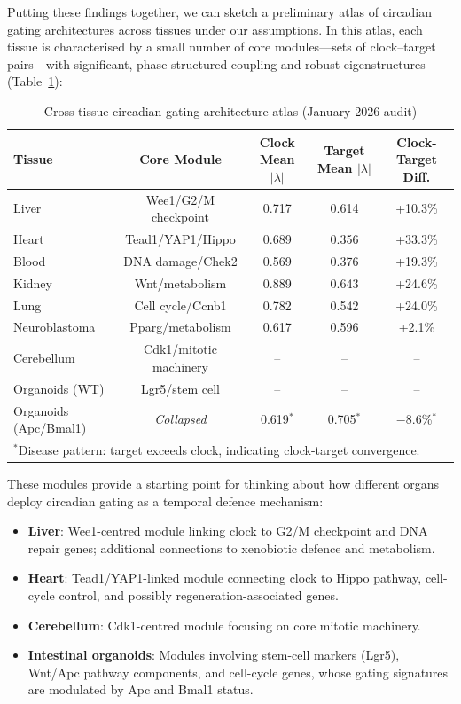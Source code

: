 \documentclass[11pt,a4paper]{article}
\begin{document}
Putting these findings together, we can sketch a preliminary atlas of circadian gating architectures across tissues under our assumptions. In this atlas, each tissue is characterised by a small number of core modules---sets of clock--target pairs---with significant, phase-structured coupling and robust eigenstructures (Table~\ref{tab:tissue_atlas}):

\begin{table}[H]
\centering
\caption{Cross-tissue circadian gating architecture atlas (January 2026 audit)}
\label{tab:tissue_atlas}
\begin{tabular}{lcccc}
\toprule
Tissue & Core Module & Clock Mean $|\lambda|$ & Target Mean $|\lambda|$ & Clock-Target Diff. \\
\midrule
Liver & Wee1/G2/M checkpoint & 0.717 & 0.614 & +10.3\% \\
Heart & Tead1/YAP1/Hippo & 0.689 & 0.356 & +33.3\% \\
Blood & DNA damage/Chek2 & 0.569 & 0.376 & +19.3\% \\
Kidney & Wnt/metabolism & 0.889 & 0.643 & +24.6\% \\
Lung & Cell cycle/Ccnb1 & 0.782 & 0.542 & +24.0\% \\
Neuroblastoma & Pparg/metabolism & 0.617 & 0.596 & +2.1\% \\
Cerebellum & Cdk1/mitotic machinery & -- & -- & -- \\
Organoids (WT) & Lgr5/stem cell & -- & -- & -- \\
Organoids (Apc/Bmal1) & \textit{Collapsed} & 0.619$^*$ & 0.705$^*$ & $-$8.6\%$^*$ \\
\bottomrule
\multicolumn{5}{l}{\small $^*$Disease pattern: target exceeds clock, indicating clock-target convergence.}
\end{tabular}
\end{table}

These modules provide a starting point for thinking about how different organs deploy circadian gating as a temporal defence mechanism:

\begin{itemize}
    \item \textbf{Liver}: Wee1-centred module linking clock to G2/M checkpoint and DNA repair genes; additional connections to xenobiotic defence and metabolism.
    
    \item \textbf{Heart}: Tead1/YAP1-linked module connecting clock to Hippo pathway, cell-cycle control, and possibly regeneration-associated genes.
    
    \item \textbf{Cerebellum}: Cdk1-centred module focusing on core mitotic machinery.
    
    \item \textbf{Intestinal organoids}: Modules involving stem-cell markers (Lgr5), Wnt/Apc pathway components, and cell-cycle genes, whose gating signatures are modulated by Apc and Bmal1 status.
\end{itemize}
\end{document}
